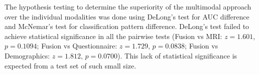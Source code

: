 \documentclass[10pt,letterpaper]{article}
\begin{document}
                                                                                                                          The hypothesis testing to determine the superiority of the multimodal approach over the individual modalities was done using DeLong's test for AUC difference and McNemar's test for classification pattern difference. DeLong's test failed to achieve statistical significance in all the pairwise tests (Fusion vs MRI: $z = 1.601$, $p = 0.1094$; Fusion vs Questionnaire: $z = 1.729$, $p = 0.0838$; Fusion vs Demographics: $z = 1.812$,
                                                                                                                                                           $p = 0.0700$). This lack of statistical
                                                                                                                                                           significance is expected from a test set of such small size.
\end{document}
